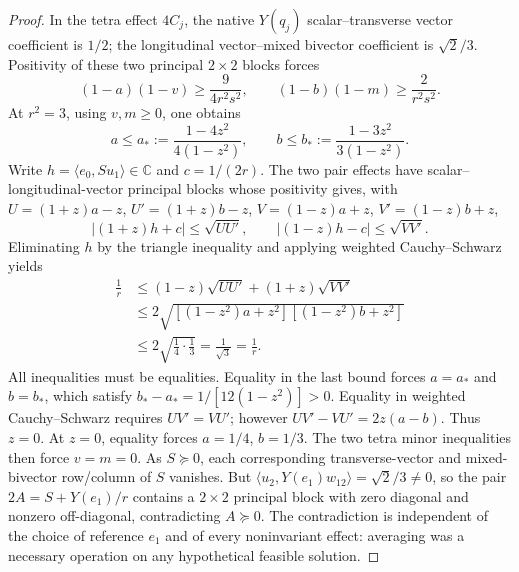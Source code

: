 \documentclass[12pt,a4paper]{article}
\begin{document}
\begin{proof}
In the tetra effect $4C_j$, the native $Y(q_j)$ scalar--transverse
vector coefficient is $1/2$; the longitudinal vector--mixed
bivector coefficient is $\sqrt2/3$. Positivity of these two
principal $2\times2$ blocks forces
\[
 (1-a)(1-v)\ge\frac9{4r^2s^2},\qquad
 (1-b)(1-m)\ge\frac2{r^2s^2}.
\]
At $r^2=3$, using $v,m\ge0$, one obtains
\[
 a\le a_*:=\frac{1-4z^2}{4(1-z^2)},\qquad
 b\le b_*:=\frac{1-3z^2}{3(1-z^2)}.
\]
Write $h=\langle e_0,S u_1\rangle\in\mathbb C$ and
$c=1/(2r)$. The two pair effects have scalar--longitudinal-vector
principal blocks whose positivity gives, with
$U=(1+z)a-z$, $U'=(1+z)b-z$,
$V=(1-z)a+z$, $V'=(1-z)b+z$,
\[
 |(1+z)h+c|\le\sqrt{UU'},\qquad
 |(1-z)h-c|\le\sqrt{VV'}.
\]
Eliminating $h$ by the triangle inequality and applying weighted
Cauchy--Schwarz yields
\begin{align*}
 \frac1r&\le(1-z)\sqrt{UU'}+(1+z)\sqrt{VV'}\\
 &\le 2\sqrt{[(1-z^2)a+z^2][(1-z^2)b+z^2]}\\
 &\le 2\sqrt{\tfrac14\cdot\tfrac13}=\frac1{\sqrt3}=\frac1r.
\end{align*}
All inequalities must be equalities. Equality in the last bound
forces $a=a_*$ and $b=b_*$, which satisfy
$b_*-a_*=1/[12(1-z^2)]>0$.
Equality in weighted Cauchy--Schwarz requires $UV'=VU'$; however
$UV'-VU'=2z(a-b)$. Thus $z=0$.
At $z=0$, equality forces $a=1/4$, $b=1/3$. The two tetra
minor inequalities then force $v=m=0$.
As $S\succeq0$, each corresponding transverse-vector and
mixed-bivector row/column of $S$ vanishes. But
$\langle u_2,Y(e_1)w_{12}\rangle=\sqrt2/3\ne0$, so the pair
$2A=S+Y(e_1)/r$ contains a $2\times2$ principal block with
zero diagonal and nonzero off-diagonal, contradicting $A\succeq0$.
The contradiction is independent of the choice of reference $e_1$
and of every noninvariant effect: averaging was a necessary operation
on any hypothetical feasible solution.
\end{proof}
\end{document}
